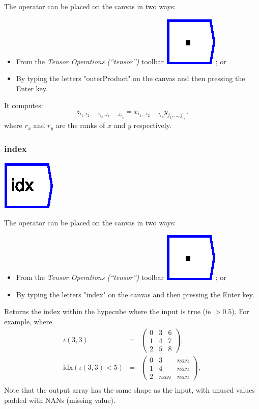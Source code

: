 The operator can be placed on the canvas in two ways:
\begin{itemize}
\item From the \emph{Tensor Operations (``tensor'')} toolbar \includegraphics{images/innerProduct};
or 
\item By typing the letters "outerProduct" on the canvas and then pressing
the Enter key.
\end{itemize}
It computes: 
\[
z_{i_{1},i_{2},\ldots,i_{r_{x}},j_{1},\ldots,j_{r_{y}}}=x_{i_{1},,i_{2},\ldots,i_{r_{x}}}y_{j_{1},\ldots,j_{r_{y}}}.
\]
where $r_{x}$ and $r_{y}$ are the ranks of $x$ and $y$ respectively.

\subsubsection{index}

\label{Operation:index}

\includegraphics{images/index}

The operator can be placed on the canvas in two ways:
\begin{itemize}
\item From the \emph{Tensor Operations (``tensor'')} toolbar \includegraphics{images/innerProduct};
or 
\item By typing the letters "index" on the canvas and then pressing the
Enter key.
\end{itemize}
Returns the index within the hypecube where the input is true (ie
$>0.5$). For example, where 
\begin{eqnarray*}
\iota(3,3) & = & \left(\begin{array}{ccc}
0 & 3 & 6\\
1 & 4 & 7\\
2 & 5 & 8
\end{array}\right),\\
\mathrm{idx}(\iota(3,3)<5) & = & \left(\begin{array}{ccc}
0 & 3 & nan\\
1 & 4 & nan\\
2 & nan & nan
\end{array}\right),\\
\end{eqnarray*}
Note that the output array has the same shape as the input, with unused
values padded with NANs (missing value).

